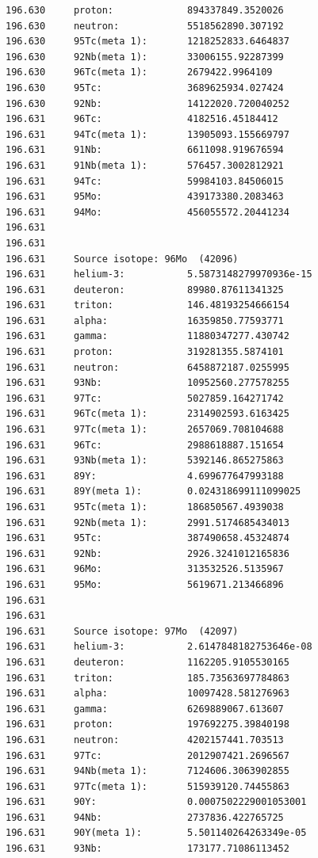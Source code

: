 \begin{lstlisting}[style=sOutputFile,caption={Final results for Molybdenum Irradiation},label={listing:activityv2iron}]
196.630     proton:             894337849.3520026
196.630     neutron:            5518562890.307192
196.630     95Tc(meta 1):       1218252833.6464837
196.630     92Nb(meta 1):       33006155.92287399
196.630     96Tc(meta 1):       2679422.9964109
196.630     95Tc:               3689625934.027424
196.630     92Nb:               14122020.720040252
196.631     96Tc:               4182516.45184412
196.631     94Tc(meta 1):       13905093.155669797
196.631     91Nb:               6611098.919676594
196.631     91Nb(meta 1):       576457.3002812921
196.631     94Tc:               59984103.84506015
196.631     95Mo:               439173380.2083463
196.631     94Mo:               456055572.20441234
196.631     
196.631     
196.631     Source isotope: 96Mo  (42096)
196.631     helium-3:           5.5873148279970936e-15
196.631     deuteron:           89980.87611341325
196.631     triton:             146.48193254666154
196.631     alpha:              16359850.77593771
196.631     gamma:              11880347277.430742
196.631     proton:             319281355.5874101
196.631     neutron:            6458872187.0255995
196.631     93Nb:               10952560.277578255
196.631     97Tc:               5027859.164271742
196.631     96Tc(meta 1):       2314902593.6163425
196.631     97Tc(meta 1):       2657069.708104688
196.631     96Tc:               2988618887.151654
196.631     93Nb(meta 1):       5392146.865275863
196.631     89Y:                4.699677647993188
196.631     89Y(meta 1):        0.024318699111099025
196.631     95Tc(meta 1):       186850567.4939038
196.631     92Nb(meta 1):       2991.5174685434013
196.631     95Tc:               387490658.45324874
196.631     92Nb:               2926.3241012165836
196.631     96Mo:               313532526.5135967
196.631     95Mo:               5619671.213466896
196.631     
196.631     
196.631     Source isotope: 97Mo  (42097)
196.631     helium-3:           2.6147848182753646e-08
196.631     deuteron:           1162205.9105530165
196.631     triton:             185.73563697784863
196.631     alpha:              10097428.581276963
196.631     gamma:              6269889067.613607
196.631     proton:             197692275.39840198
196.631     neutron:            4202157441.703513
196.631     97Tc:               2012907421.2696567
196.631     94Nb(meta 1):       7124606.3063902855
196.631     97Tc(meta 1):       515939120.74455863
196.631     90Y:                0.0007502229001053001
196.631     94Nb:               2737836.422765725
196.631     90Y(meta 1):        5.501140264263349e-05
196.631     93Nb:               173177.71086113452

\end{lstlisting}
